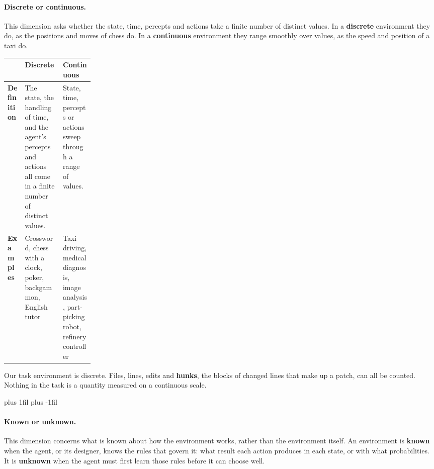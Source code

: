 \paragraph{Discrete or continuous.}\leavevmode\par\nopagebreak
This dimension asks whether the state, time, percepts and actions take a finite number of distinct
values. In a \textbf{discrete} environment they do, as the positions and moves of chess do. In a
\textbf{continuous} environment they range smoothly over values, as the speed and position of a
taxi do.
\par\nopagebreak\smallskip
\noindent\begin{adjustbox}{width=\linewidth}\begin{tabularx}{\linewidth}{L{0.2\linewidth}XX}
  \toprule
  & \textbf{Discrete} & \textbf{Continuous} \\
  \midrule
  \textbf{Definition} & The state, the handling of time, and the agent's percepts and actions all
  come in a finite number of distinct values. & State, time, percepts or actions sweep through a
  range of values. \\
  \textbf{Examples} & Crossword, chess with a clock, poker, backgammon, English tutor & Taxi
  driving, medical diagnosis, image analysis, part-picking robot, refinery controller \\
  \bottomrule
\end{tabularx}\end{adjustbox}\par
Our task environment is discrete. Files, lines, edits and \textbf{hunks}, the blocks of changed
lines that make up a patch, can all be counted. Nothing in the task is a quantity measured on a
continuous scale.

\par\vskip 0pt plus 1fil\vskip 0pt plus -1fil\relax
\paragraph{Known or unknown.}\leavevmode\par\nopagebreak
This dimension concerns what is known about how the environment works, rather than the environment
itself. An environment is \textbf{known} when the agent, or its designer, knows the rules that
govern it: what result each action produces in each state, or with what probabilities. It is
\textbf{unknown} when the agent must first learn those rules before it can choose well.

